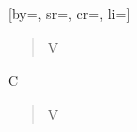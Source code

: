 [by={}, sr={}, cr={}, li={}]

\begin{verse}
V
\end{verse}

\begin{chorus}
C
\end{chorus}

\chordsoff

\begin{verse}
V
\end{verse}

\endsong